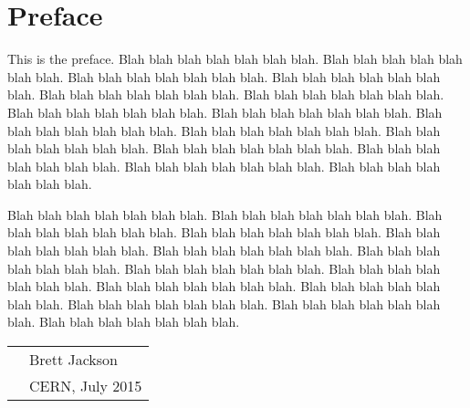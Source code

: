 
\chapter*{Preface}

This is the preface.  Blah blah blah blah blah blah blah.
Blah blah blah blah blah blah blah.  Blah blah blah blah blah blah blah.
Blah blah blah blah blah blah blah.  Blah blah blah blah blah blah blah.
Blah blah blah blah blah blah blah.  Blah blah blah blah blah blah blah.
Blah blah blah blah blah blah blah.  Blah blah blah blah blah blah blah.
Blah blah blah blah blah blah blah.  Blah blah blah blah blah blah blah.
Blah blah blah blah blah blah blah.  Blah blah blah blah blah blah blah.
Blah blah blah blah blah blah blah.  Blah blah blah blah blah blah blah.

Blah blah blah blah blah blah blah.  Blah blah blah blah blah blah blah.
Blah blah blah blah blah blah blah.  Blah blah blah blah blah blah blah.
Blah blah blah blah blah blah blah.  Blah blah blah blah blah blah blah.
Blah blah blah blah blah blah blah.  Blah blah blah blah blah blah blah.
Blah blah blah blah blah blah blah.  Blah blah blah blah blah blah blah.
Blah blah blah blah blah blah blah.  Blah blah blah blah blah blah blah.
Blah blah blah blah blah blah blah.  Blah blah blah blah blah blah blah.

\vspace{0.05\textheight}

\begin{tabular}{p{} l}
  & Brett Jackson         \\
  & CERN, July 2015   \\
\end{tabular}

